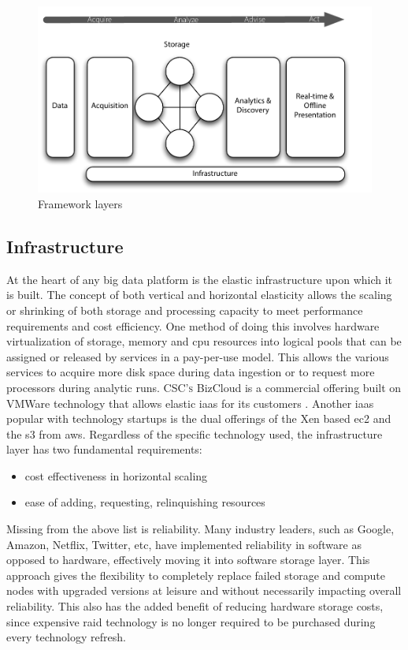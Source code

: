 \begin{figure}[!htbp]
    \centering
    \includegraphics[scale=.62]{framework_layers}
    \caption{Framework layers}
    \label{layers}
\end{figure}
\subsection{Infrastructure}
At the heart of any big data platform is the elastic infrastructure upon which it is built. The concept of both vertical and horizontal elasticity allows the scaling or shrinking of both storage and processing capacity to meet performance requirements and cost efficiency. One method of doing this involves hardware virtualization  of storage, memory and cpu resources into logical pools that can be assigned or released by services in a pay-per-use model. This allows the various services to acquire more disk space during data ingestion or to request more processors during analytic runs. \textsc{CSC's} BizCloud is a commercial offering built on VMWare  technology that allows elastic \gls{iaas} for its customers \cite{bizcloud}. Another \gls{iaas} popular with technology startups is the dual offerings of the Xen based \gls{ec2} and the \gls{s3} from \gls{aws}. Regardless of the specific technology used, the infrastructure layer has two fundamental requirements:
\begin{itemize}
    \item cost effectiveness in horizontal scaling
    \item ease of adding, requesting, relinquishing resources
\end{itemize}
Missing from the above list is reliability. Many industry leaders, such as Google, Amazon, Netflix, Twitter, etc, have implemented reliability in software as opposed to hardware, effectively moving it into software storage layer. This approach gives the flexibility to completely replace failed storage and compute nodes with upgraded versions at leisure and without necessarily impacting overall reliability. This also has the added benefit of  reducing hardware storage costs, since expensive \gls{raid} technology is no longer required to be purchased during every technology refresh.\\

